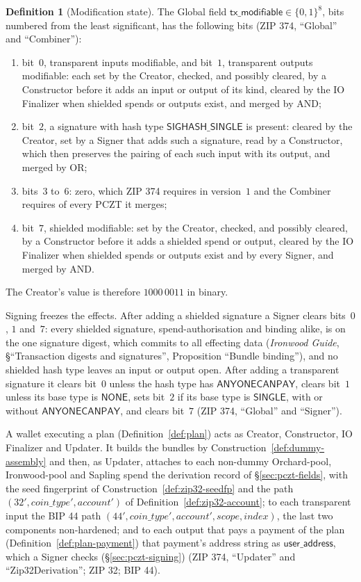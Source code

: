 \documentclass[11pt,a4paper]{article}
\theoremstyle{definition}
\newtheorem{definition}[theorem]{Definition}
\begin{document}
\begin{definition}[Modification state]\label{def:pczt-modifiable}
The Global field $\mathsf{tx\_}\allowbreak\mathsf{modifiable} \in \{0,1\}^8$,
bits numbered from
the least significant, has the following bits (ZIP 374, ``Global'' and
``Combiner''):
\begin{enumerate}[label=(\roman*)]
\item bit~$0$, transparent inputs modifiable, and bit~$1$, transparent
  outputs modifiable: each set by the Creator, checked, and possibly
  cleared, by a Constructor before it adds an input or output of its kind,
  cleared by the IO Finalizer when shielded spends or outputs exist, and
  merged by AND;
\item bit~$2$, a signature with hash type $\mathsf{SIGHASH\_SINGLE}$ is
  present: cleared by the Creator, set by a Signer that adds such a
  signature, read by a Constructor, which then preserves the pairing of each
  such input with its output, and merged by OR;
\item bits~$3$ to~$6$: zero, which ZIP 374 requires in version~$1$ and the
  Combiner requires of every PCZT it merges;
\item bit~$7$, shielded modifiable: set by the Creator, checked, and
  possibly cleared, by a Constructor before it adds a shielded spend or
  output, cleared by the IO Finalizer when shielded spends or outputs exist
  and by every Signer, and merged by AND.
\end{enumerate}
The Creator's value is therefore $1000\,0011$ in binary.
\end{definition}

Signing freezes the effects. After adding a shielded signature a Signer
clears bits~$0$, $1$ and~$7$: every shielded signature, spend-authorisation
and binding alike, is on the one signature digest, which commits to all
effecting data (\emph{Ironwood Guide}, \S``Transaction digests and
signatures'', Proposition ``Bundle binding''), and no shielded hash type
leaves an input or output open. After adding a transparent signature it
clears bit~$0$ unless the hash type has $\mathsf{ANYONECANPAY}$, clears
bit~$1$ unless its base type is $\mathsf{NONE}$, sets bit~$2$ if its base
type is $\mathsf{SINGLE}$, with or without $\mathsf{ANYONECANPAY}$, and
clears bit~$7$ (ZIP 374, ``Global'' and ``Signer'').

A wallet executing a plan (Definition~\ref{def:plan}) acts as Creator,
Constructor, IO Finalizer and Updater. It builds the bundles by
Construction~\ref{def:dummy-assembly} and then, as Updater, attaches to
each non-dummy Orchard-pool, Ironwood-pool and Sapling spend the derivation
record of \S\ref{sec:pczt-fields}, with the seed fingerprint of
Construction~\ref{def:zip32-seedfp} and the path
$(32', \mathit{coin\_type}', \mathit{account}')$ of
Definition~\ref{def:zip32-account}; to each transparent input the BIP 44
path $(44', \mathit{coin\_type}', \mathit{account}', \mathit{scope},
\mathit{index})$, the last two components non-hardened; and to each output
that pays a payment of the plan (Definition~\ref{def:plan-payment}) that
payment's address string as $\mathsf{user\_address}$, which a Signer checks
(\S\ref{sec:pczt-signing}) (ZIP 374, ``Updater'' and ``Zip32Derivation'';
ZIP 32; BIP 44).
\end{document}
